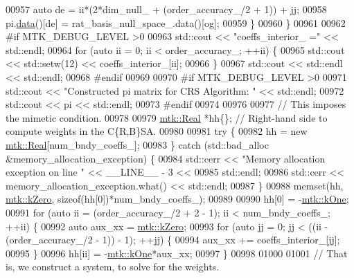 \begin{DoxyCode}
{{00957       \textcolor{keyword}{auto} de = ii*(2*dim\_null\_ + (order\_accuracy\_/2 + 1)) + jj;
00958       pi.\hyperlink{classmtk_1_1DenseMatrix_a16b3ff56feb2658b9fc7147d1de4d8e7}{data}()[de] = rat\_basis\_null\_space\_.data()[og];
00959     \}
00960   \}
00961 
00962 \textcolor{preprocessor}{  #if MTK\_DEBUG\_LEVEL >0}
00963   std::cout << \textcolor{stringliteral}{"coeffs\_interior\_ ="} << std::endl;
00964   \textcolor{keywordflow}{for} (\textcolor{keyword}{auto} ii = 0; ii < order\_accuracy\_; ++ii) \{
00965     std::cout << std::setw(12) << coeffs\_interior\_[ii];
00966   \}
00967   std::cout << std::endl << std::endl;
00968 \textcolor{preprocessor}{  #endif}
00969 
00970 \textcolor{preprocessor}{  #if MTK\_DEBUG\_LEVEL >0}
00971   std::cout << \textcolor{stringliteral}{"Constructed pi matrix for CRS Algorithm: "} << std::endl;
00972   std::cout << pi << std::endl;
00973 \textcolor{preprocessor}{  #endif}
00974 
00976 
00977   \textcolor{comment}{// This imposes the mimetic condition.}
00978 
00979   \hyperlink{group__c01-roots_gac080bbbf5cbb5502c9f00405f894857d}{mtk::Real} *hh\{\};  \textcolor{comment}{// Right-hand side to compute weights in the C\{R,B\}SA.}
00980 
00981   \textcolor{keywordflow}{try} \{
00982     hh = \textcolor{keyword}{new} \hyperlink{group__c01-roots_gac080bbbf5cbb5502c9f00405f894857d}{mtk::Real}[num\_bndy\_coeffs\_];
00983   \} \textcolor{keywordflow}{catch} (std::bad\_alloc &memory\_allocation\_exception) \{
00984     std::cerr << \textcolor{stringliteral}{"Memory allocation exception on line "} << \_\_LINE\_\_ - 3 <<
00985       std::endl;
00986     std::cerr << memory\_allocation\_exception.what() << std::endl;
00987   \}
00988   memset(hh, \hyperlink{group__c01-roots_ga59a451a5fae30d59649bcda274fea271}{mtk::kZero}, \textcolor{keyword}{sizeof}(hh[0])*num\_bndy\_coeffs\_);
00989 
00990   hh[0] = -\hyperlink{group__c01-roots_ga26407c24d43b6b95480943340d285c71}{mtk::kOne};
00991   \textcolor{keywordflow}{for} (\textcolor{keyword}{auto} ii = (order\_accuracy\_/2 + 2 - 1); ii < num\_bndy\_coeffs\_; ++ii) \{
00992     \textcolor{keyword}{auto} aux\_xx = \hyperlink{group__c01-roots_ga59a451a5fae30d59649bcda274fea271}{mtk::kZero};
00993     \textcolor{keywordflow}{for} (\textcolor{keyword}{auto} jj = 0; jj < ((ii - (order\_accuracy\_/2 - 1)) - 1); ++jj) \{
00994       aux\_xx += coeffs\_interior\_[jj];
00995     \}
00996     hh[ii] = -\hyperlink{group__c01-roots_ga26407c24d43b6b95480943340d285c71}{mtk::kOne}*aux\_xx;
00997   \}
00998 
01000 
01001   \textcolor{comment}{// That is, we construct a system, to solve for the weights.}
}}
\end{DoxyCode}

